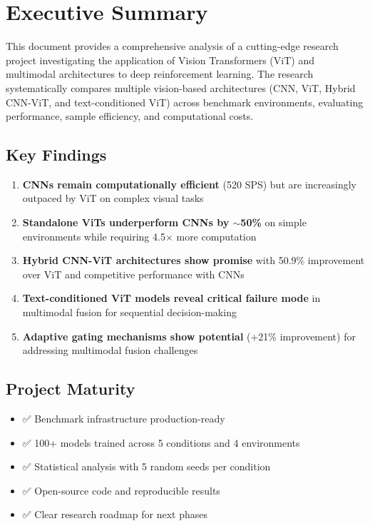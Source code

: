 \documentclass[12pt,a4paper,openany]{report}
\begin{document}
\newpage
\tableofcontents
\newpage

\chapter{Executive Summary}

This document provides a comprehensive analysis of a cutting-edge research project investigating the application of Vision Transformers (ViT) and multimodal architectures to deep reinforcement learning. The research systematically compares multiple vision-based architectures (CNN, ViT, Hybrid CNN-ViT, and text-conditioned ViT) across benchmark environments, evaluating performance, sample efficiency, and computational costs.

\section{Key Findings}

\begin{enumerate}
    \item \textbf{CNNs remain computationally efficient} (520 SPS) but are increasingly outpaced by ViT on complex visual tasks
    \item \textbf{Standalone ViTs underperform CNNs by $\sim$50\%} on simple environments while requiring 4.5$\times$ more computation
    \item \textbf{Hybrid CNN-ViT architectures show promise} with 50.9\% improvement over ViT and competitive performance with CNNs
    \item \textbf{Text-conditioned ViT models reveal critical failure mode} in multimodal fusion for sequential decision-making
    \item \textbf{Adaptive gating mechanisms show potential} (+21\% improvement) for addressing multimodal fusion challenges
\end{enumerate}

\section{Project Maturity}

\begin{itemize}
    \item ✅ Benchmark infrastructure production-ready
    \item ✅ 100+ models trained across 5 conditions and 4 environments
    \item ✅ Statistical analysis with 5 random seeds per condition
    \item ✅ Open-source code and reproducible results
    \item ✅ Clear research roadmap for next phases
\end{itemize}
\end{document}
